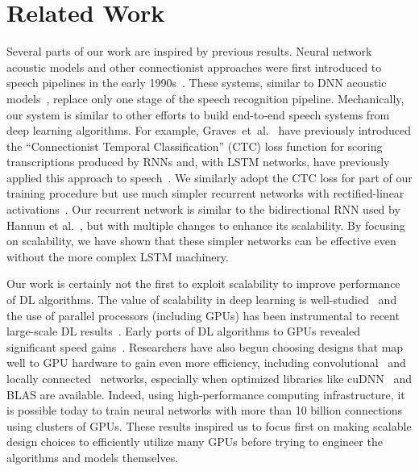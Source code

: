\section{Related Work}
\label{sec:deepspeech:related}

Several parts of our work are inspired by previous results. Neural network
acoustic models and other connectionist approaches were first introduced to
speech pipelines in the early 1990s~\cite{bourlard93, renals1994, ellis1999}.
These systems, similar to DNN acoustic models~\cite{mohamed2011, hinton2012,
dahl2011a}, replace only one stage of the speech recognition pipeline.
Mechanically, our system is similar to other efforts to build end-to-end speech
systems from deep learning algorithms. For example,
Graves~et~al.~\cite{graves2006} have previously introduced the ``Connectionist
Temporal Classification'' (CTC) loss function for scoring transcriptions
produced by RNNs and, with LSTM networks, have previously applied this approach
to speech~\cite{graves2014}. We similarly adopt the CTC loss for part of our
training procedure but use much simpler recurrent networks with
rectified-linear activations~\cite{glorot2011, maas2013, nair2010}. Our
recurrent network is similar to the bidirectional RNN used by Hannun et
al.~\cite{hannun2014firstpass}, but with multiple changes to enhance its
scalability. By focusing on scalability, we have shown that these simpler
networks can be effective even without the more complex LSTM machinery.

Our work is certainly not the first to exploit scalability to improve
performance of DL algorithms. The value of scalability in deep learning is
well-studied~\cite{coates2011b, le2013} and the use of parallel processors
(including GPUs) has been instrumental to recent large-scale DL
results~\cite{szegedy2015, le2013}. Early ports of DL algorithms to GPUs
revealed significant speed gains~\cite{raina2009}. Researchers have also begun
choosing designs that map well to GPU hardware to gain even more efficiency,
including convolutional~\cite{krizhevsky2012imagenet, ciresan2011,
sainath2013b} and locally connected~\cite{coates2013cotshpc, ciresan2012}
networks, especially when optimized libraries like
cuDNN~\cite{chetlur2014cudnn} and BLAS are available. Indeed, using
high-performance computing infrastructure, it is possible today to train neural
networks with more than 10 billion connections~\cite{coates2013cotshpc} using
clusters of GPUs. These results inspired us to focus first on making scalable
design choices to efficiently utilize many GPUs before trying to engineer the
algorithms and models themselves.

